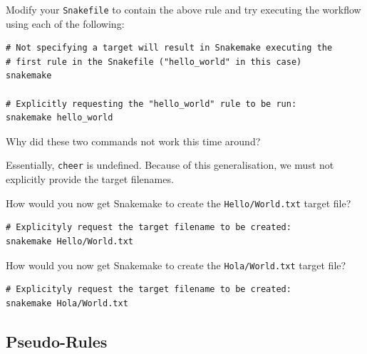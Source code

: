 \begin{steps}

Modify your \texttt{Snakefile} to contain the above rule and try executing the workflow using each of the following:

\begin{lstlisting}
# Not specifying a target will result in Snakemake executing the
# first rule in the Snakefile ("hello_world" in this case)
snakemake

# Explicitly requesting the "hello_world" rule to be run:
snakemake hello_world
\end{lstlisting}

\begin{questions}

Why did these two commands not work this time around?

\begin{answer}

Essentially, \texttt{cheer} is undefined. Because of this generalisation, we must not explicitly provide the target filenames.

\end{answer}

How would you now get Snakemake to create the \texttt{Hello/World.txt} target file?

\begin{answer}

\begin{lstlisting}
# Explicityly request the target filename to be created:
snakemake Hello/World.txt
\end{lstlisting}

\end{answer}

How would you now get Snakemake to create the \texttt{Hola/World.txt} target file?

\begin{answer}

\begin{lstlisting}
# Explicityly request the target filename to be created:
snakemake Hola/World.txt
\end{lstlisting}

\end{answer}

\end{questions}

\end{steps}


\subsection{Pseudo-Rules}

